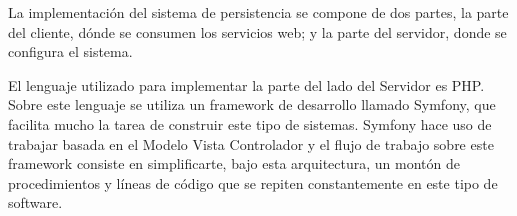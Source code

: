 La implementación del sistema de persistencia se compone de dos partes, la parte del cliente, dónde se consumen los servicios web; y la parte del servidor, donde se configura el sistema.

El lenguaje utilizado para implementar la parte del lado del Servidor es PHP. Sobre este lenguaje se utiliza un framework de desarrollo llamado Symfony, que facilita mucho la tarea de construir este tipo de sistemas. Symfony hace uso de trabajar basada en el Modelo Vista Controlador y el flujo de trabajo sobre este framework consiste en simplificarte, bajo esta arquitectura, un montón de procedimientos y líneas de código que se repiten constantemente en este tipo de software.

